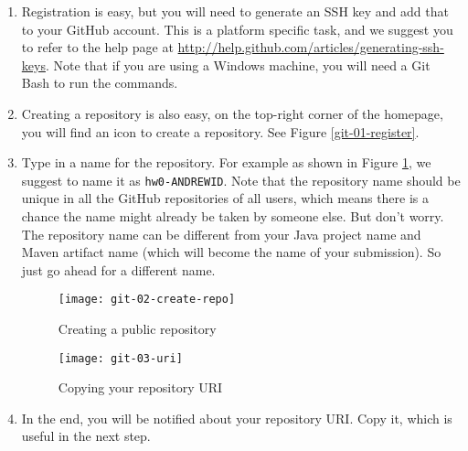 \begin{enumerate}
\item Registration is easy, but you will need to generate an SSH key and add that to your GitHub account. This is a platform specific task, and we suggest you to refer to the help page at \url{http://help.github.com/articles/generating-ssh-keys}. Note that if you are using a Windows machine, you will need a Git Bash to run the commands.


\item Creating a repository is also easy, on the top-right corner of the homepage, you will find an icon to create a repository. See Figure \ref{git-01-register}.

\item Type in a name for the repository. For example as shown in Figure \ref{git-02-create-repo}, we suggest to name it as \texttt{hw0-ANDREWID}. Note that the repository name should be unique in all the GitHub repositories of all users, which means there is a chance the name might already be taken by someone else. But don't worry. The repository name can be different from your Java project name and Maven artifact name (which will become the name of your submission). So just go ahead for a different name.

\begin{figure}[t]
\centering
\texttt{[image: git-02-create-repo]}
\caption{Creating a public repository\label{git-02-create-repo}}
\end{figure}

\begin{figure}[t]
\centering
\texttt{[image: git-03-uri]}
\caption{Copying your repository URI\label{git-03-uri}}
\end{figure}

\item In the end, you will be notified about your repository URI. Copy it, which is useful in the next step.

\end{enumerate}

